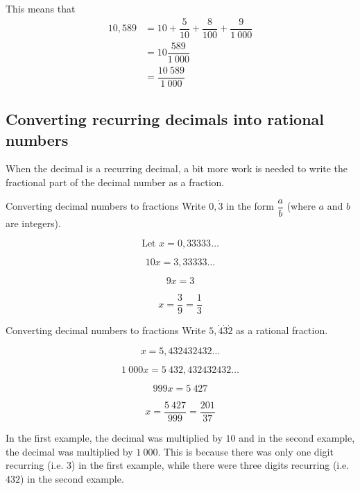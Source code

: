 This means that
\begin{align*}
  10,589 &= 10 + \dfrac{5}{10} + \dfrac{8}{100} + \dfrac{9}{1~000} \\
  &= 10 \dfrac{589}{1~000} \\
  &= \dfrac{10~589}{1~000}
\end{align*}

\subsection{Converting recurring decimals into rational numbers}


When the decimal is a recurring decimal, a bit more work is needed to write the fractional part of the decimal number as a fraction.\par 

\begin{wex}
{%
Converting decimal numbers to fractions
}
{%
Write $0,\dot{3}$ in the form $\dfrac{a}{b}$ (where $a$ and $b$ are integers).
}
{%

$$\mbox{Let } x = 0,33333\ldots$$

$$10x = 3,33333\ldots$$

$$9x = 3 $$

$$ x = \dfrac{3}{9} = \dfrac{1}{3} $$
}
\end{wex}


\begin{wex}
{%
Converting decimal numbers to fractions
}
{%
Write $5,\dot{4}\dot{3}\dot{2}$ as a rational fraction.
}
{%

$$ x = 5,432432432\ldots $$

$$ 1~000x = 5~432,432432432\ldots $$

$$ 999x = 5~427 $$

$$ x = \dfrac{5~427}{999} = \dfrac{201}{37} $$
}
\end{wex}




In the first example, the decimal was multiplied by $10$ and in the
second example, the decimal was multiplied by $1~000$. This is because
there was only one digit recurring (i.e. $3$) in the first example,
while there were three digits recurring (i.e. $432$) in the second
example.\par 

